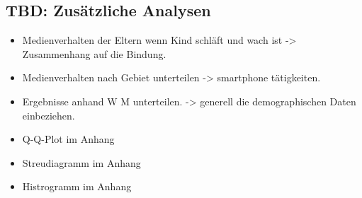 \subsection{TBD: Zusätzliche Analysen} \label{sec:ZusätzlicheAnalysen}

\begin{itemize}
    \item Medienverhalten der Eltern wenn Kind schläft und wach ist -> Zusammenhang auf die Bindung.
    \item Medienverhalten nach Gebiet unterteilen -> smartphone tätigkeiten.
    \item Ergebnisse anhand W M unterteilen. -> generell die demographischen Daten einbeziehen.
\end{itemize}



\begin{itemize}
    \item Q-Q-Plot im Anhang
    \item Streudiagramm im Anhang
    \item Histrogramm im Anhang
\end{itemize}




